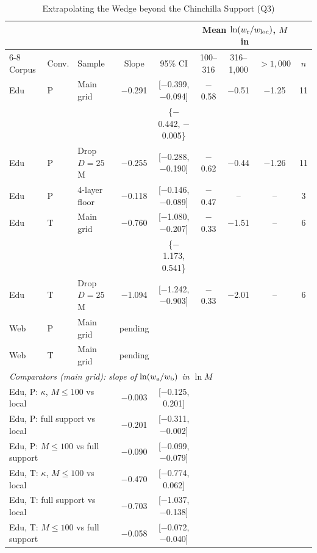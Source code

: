 \begin{table}[tp]
\centering
\caption{Extrapolating the Wedge beyond the Chinchilla Support (Q3)}
\label{tab:m9-extrap}
\footnotesize
\setlength{\tabcolsep}{3pt}
\begin{tabular*}{\textwidth}{@{\extracolsep{\fill}}lllcccccc@{}}
\toprule
& & & & & \multicolumn{3}{c}{Mean $\ln(w_{\rm r}/w_{\rm loc})$, $M$ in} & \\
\cmidrule(lr){6-8}
Corpus & Conv. & Sample & Slope & 95\% CI & 100--316 & 316--1{,}000 & $>1{,}000$ & $n$ \\
\midrule
Edu & P & Main grid & $-$0.291 & [$-$0.399, $-$0.094] & $-$0.58 & $-$0.51 & $-$1.25 & 11 \\
& & & & \{$-$0.442, $-$0.005\} & & & & \\
Edu & P & Drop $D=25$M & $-$0.255 & [$-$0.288, $-$0.190] & $-$0.62 & $-$0.44 & $-$1.26 & 11 \\
Edu & P & 4-layer floor & $-$0.118 & [$-$0.146, $-$0.089] & $-$0.47 & -- & -- & 3 \\
Edu & T & Main grid & $-$0.760 & [$-$1.080, $-$0.207] & $-$0.33 & $-$1.51 & -- & 6 \\
& & & & \{$-$1.173, 0.541\} & & & & \\
Edu & T & Drop $D=25$M & $-$1.094 & [$-$1.242, $-$0.903] & $-$0.33 & $-$2.01 & -- & 6 \\
Web & P & Main grid & pending & & & & & \\
Web & T & Main grid & pending & & & & & \\
\midrule
\multicolumn{9}{l}{\emph{Comparators (main grid): slope of $\ln(w_{\rm a}/w_{\rm b})$ in $\ln M$}} \\
\multicolumn{3}{l}{Edu, P: $\kappa$, $M\le100$ vs local} & $-$0.003 & [$-$0.125, 0.201] & & & & \\
\multicolumn{3}{l}{Edu, P: full support vs local} & $-$0.201 & [$-$0.311, $-$0.002] & & & & \\
\multicolumn{3}{l}{Edu, P: $M\le100$ vs full support} & $-$0.090 & [$-$0.099, $-$0.079] & & & & \\
\multicolumn{3}{l}{Edu, T: $\kappa$, $M\le100$ vs local} & $-$0.470 & [$-$0.774, 0.062] & & & & \\
\multicolumn{3}{l}{Edu, T: full support vs local} & $-$0.703 & [$-$1.037, $-$0.138] & & & & \\
\multicolumn{3}{l}{Edu, T: $M\le100$ vs full support} & $-$0.058 & [$-$0.072, $-$0.040] & & & & \\
\bottomrule
\end{tabular*}


\end{table}
